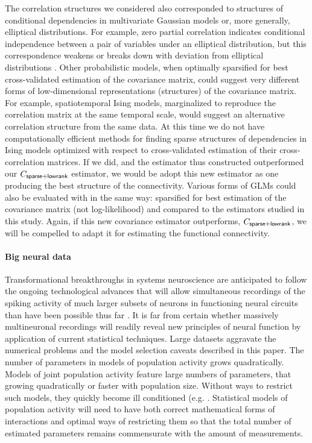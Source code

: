 \documentclass[10pt]{article}
\begin{document}
The correlation structures we considered also corresponded to structures of conditional dependencies in multivariate Gaussian models or, more generally, elliptical distributions. For example, zero partial correlation indicates conditional independence between a pair of variables under an elliptical distribution, but this correspondence weakens or breaks down with deviation from elliptical distributions \cite{Loh:2012}.  Other probabilistic models, when optimally sparsified for best cross-validated estimation of the covariance matrix, could suggest very different forms of low-dimensional representations (structures) of the covariance matrix. For example, spatiotemporal Ising models, marginalized to reproduce the correlation matrix at the same temporal scale, would suggest an alternative correlation structure from the same data. At this time we do not have computationally efficient methods for finding sparse structures of dependencies in Ising models optimized with respect to cross-validated estimation of their cross-correlation matrices. If we did, and the estimator thus constructed outperformed our $C_{\sf sparse+lowrank}$ estimator, we would be adopt this new estimator as one producing the best structure of the connectivity. Various forms of GLMs could also be evaluated with in the same way: sparsified for best estimation of the covariance matrix (not log-likelihood) and compared to the estimators studied in this study.  Again, if this new covariance estimator outperforms, $C_{\sf sparse+lowrank}$, we will be compelled to adapt it for estimating the functional connectivity.

\paragraph{Big neural data}
Transformational breakthroughs in systems neuroscience are anticipated to follow the ongoing technological advances that will allow simultaneous recordings of the spiking activity of much larger subsets of neurons in functioning neural circuits than have been possible thus far \cite{Alivisatos:2013}. It is far from certain whether massively multineuronal recordings will readily reveal new principles of neural function by application of current statistical techniques. Large datasets aggravate the numerical problems and the model selection caveats described in this paper. The number of parameters in models of population activity grows quadratically.  Models of joint population activity feature large numbers of parameters, that growing quadratically or faster with population size. Without ways to restrict such models, they quickly become ill conditioned (e.g. \cite{Roudi:2009}.  Statistical models of population activity will need to have both correct mathematical forms of interactions and optimal ways of restricting them so that the total number of estimated parameters remains commensurate with the amount of measurements. 
\end{document}
